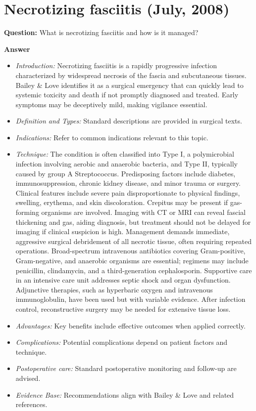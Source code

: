 \documentclass{article}
\begin{document}
\section{Necrotizing fasciitis (July, 2008)}

\textbf{Question:} What is necrotizing fasciitis and how is it managed?

\textbf{Answer}
\begin{itemize}

\item \emph{Introduction:} Necrotizing fasciitis is a rapidly progressive infection characterized by widespread necrosis of the fascia and subcutaneous tissues. Bailey \& Love identifies it as a surgical emergency that can quickly lead to systemic toxicity and death if not promptly diagnosed and treated. Early symptoms may be deceptively mild, making vigilance essential.
\item \emph{Definition and Types:} Standard descriptions are provided in surgical texts.
\item \emph{Indications:} Refer to common indications relevant to this topic.

\item \emph{Technique:} The condition is often classified into Type I, a polymicrobial infection involving aerobic and anaerobic bacteria, and Type II, typically caused by group A Streptococcus. Predisposing factors include diabetes, immunosuppression, chronic kidney disease, and minor trauma or surgery. Clinical features include severe pain disproportionate to physical findings, swelling, erythema, and skin discoloration. Crepitus may be present if gas-forming organisms are involved. Imaging with CT or MRI can reveal fascial thickening and gas, aiding diagnosis, but treatment should not be delayed for imaging if clinical suspicion is high. Management demands immediate, aggressive surgical debridement of all necrotic tissue, often requiring repeated operations. Broad-spectrum intravenous antibiotics covering Gram-positive, Gram-negative, and anaerobic organisms are essential; regimens may include penicillin, clindamycin, and a third-generation cephalosporin. Supportive care in an intensive care unit addresses septic shock and organ dysfunction. Adjunctive therapies, such as hyperbaric oxygen and intravenous immunoglobulin, have been used but with variable evidence. After infection control, reconstructive surgery may be needed for extensive tissue loss.
\item \emph{Advantages:} Key benefits include effective outcomes when applied correctly.
\item \emph{Complications:} Potential complications depend on patient factors and technique.
\item \emph{Postoperative care:} Standard postoperative monitoring and follow-up are advised.
\item \emph{Evidence Base:} Recommendations align with Bailey \& Love and related references.


\end{itemize}
\end{document}
